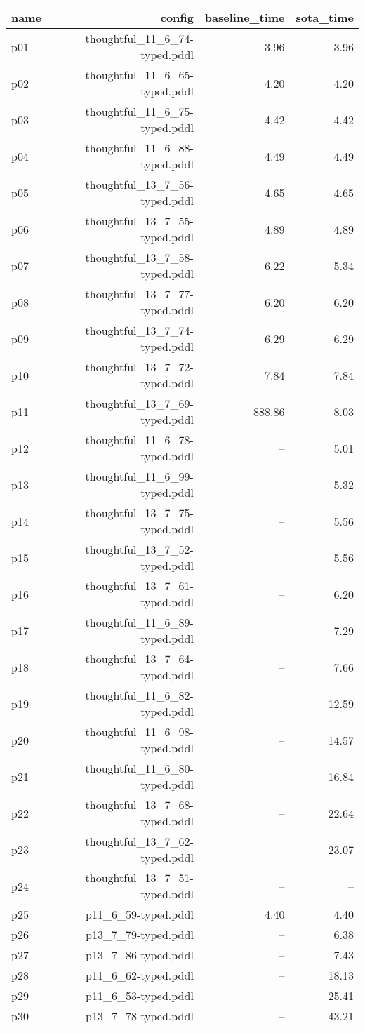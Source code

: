 \documentclass{article}
\begin{document}
                            \begin{center}
                            \scriptsize
                            \begin{tabular}{@{}l|r|r|r@{}}
                            name & config & baseline\_time & sota\_time\\\midrule
                              p01& thoughtful\_11\_6\_74-typed.pddl&3.96&3.96\\
  p02& thoughtful\_11\_6\_65-typed.pddl&4.20&4.20\\
  p03& thoughtful\_11\_6\_75-typed.pddl&4.42&4.42\\
  p04& thoughtful\_11\_6\_88-typed.pddl&4.49&4.49\\
  p05& thoughtful\_13\_7\_56-typed.pddl&4.65&4.65\\
  p06& thoughtful\_13\_7\_55-typed.pddl&4.89&4.89\\
  p07& thoughtful\_13\_7\_58-typed.pddl&6.22&5.34\\
  p08& thoughtful\_13\_7\_77-typed.pddl&6.20&6.20\\
  p09& thoughtful\_13\_7\_74-typed.pddl&6.29&6.29\\
  p10& thoughtful\_13\_7\_72-typed.pddl&7.84&7.84\\
  p11& thoughtful\_13\_7\_69-typed.pddl&888.86&8.03\\
  p12& thoughtful\_11\_6\_78-typed.pddl&--&5.01\\
  p13& thoughtful\_11\_6\_99-typed.pddl&--&5.32\\
  p14& thoughtful\_13\_7\_75-typed.pddl&--&5.56\\
  p15& thoughtful\_13\_7\_52-typed.pddl&--&5.56\\
  p16& thoughtful\_13\_7\_61-typed.pddl&--&6.20\\
  p17& thoughtful\_11\_6\_89-typed.pddl&--&7.29\\
  p18& thoughtful\_13\_7\_64-typed.pddl&--&7.66\\
  p19& thoughtful\_11\_6\_82-typed.pddl&--&12.59\\
  p20& thoughtful\_11\_6\_98-typed.pddl&--&14.57\\
  p21& thoughtful\_11\_6\_80-typed.pddl&--&16.84\\
  p22& thoughtful\_13\_7\_68-typed.pddl&--&22.64\\
  p23& thoughtful\_13\_7\_62-typed.pddl&--&23.07\\
  p24& thoughtful\_13\_7\_51-typed.pddl&--&--\\
  p25& p11\_6\_59-typed.pddl&4.40&4.40\\
  p26& p13\_7\_79-typed.pddl&--&6.38\\
  p27& p13\_7\_86-typed.pddl&--&7.43\\
  p28& p11\_6\_62-typed.pddl&--&18.13\\
  p29& p11\_6\_53-typed.pddl&--&25.41\\
  p30& p13\_7\_78-typed.pddl&--&43.21
                            \end{tabular}
                            \end{center}
                    
\end{document}
